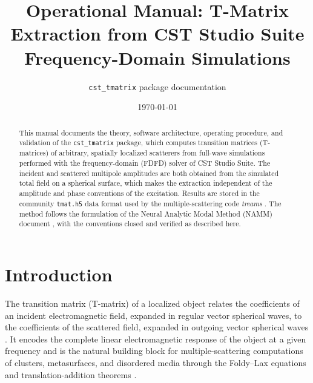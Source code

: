 \documentclass[11pt]{article}
\title{Operational Manual: T-Matrix Extraction from CST Studio Suite\\
Frequency-Domain Simulations}
\author{\texttt{cst\_tmatrix} package documentation}
\date{\today}
\begin{document}
\maketitle

\begin{abstract}
This manual documents the theory, software architecture, operating
procedure, and validation of the \texttt{cst\_tmatrix} package, which
computes transition matrices (T-matrices) of arbitrary, spatially
localized scatterers from full-wave simulations performed with the
frequency-domain (FDFD) solver of CST Studio Suite.  The incident and
scattered multipole amplitudes are both obtained from the simulated total
field on a spherical surface, which makes the extraction independent of
the amplitude and phase conventions of the excitation.  Results are
stored in the community \texttt{tmat.h5} data format
\cite{Asadova2025format} used by the multiple-scattering code
\emph{treams} \cite{Beutel2024treams}.  The method follows the
formulation of the Neural Analytic Modal Method (NAMM) document
\cite{NAMM}, with the conventions closed and verified as described here.
\end{abstract}

\tableofcontents

\section{Introduction}
The transition matrix (T-matrix) of a localized object relates the
coefficients of an incident electromagnetic field, expanded in regular
vector spherical waves, to the coefficients of the scattered field,
expanded in outgoing vector spherical waves
\cite{Waterman1965,Mishchenko2002}.  It encodes the complete linear
electromagnetic response of the object at a given frequency and is the
natural building block for multiple-scattering computations of clusters,
metasurfaces, and disordered media through the Foldy--Lax equations and
translation-addition theorems \cite{Foldy1945,Tsang2001}.
\end{document}
